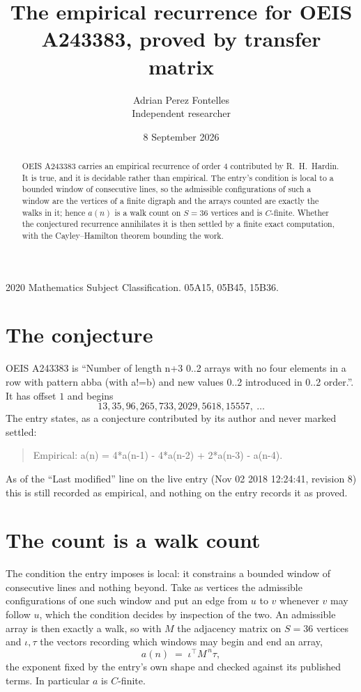 \documentclass[11pt,a4paper]{article}
\title{The empirical recurrence for OEIS A243383, proved by transfer matrix}
\author{Adrian Perez Fontelles\\ \small Independent researcher}
\date{8 September 2026}
\theoremstyle{plain}
\theoremstyle{definition}
\begin{document}
\maketitle

\begin{abstract}
OEIS A243383 carries an empirical recurrence of order $4$ contributed by R.~H.~Hardin. It is
true, and it is decidable rather than empirical. The entry's condition is local to a bounded window of consecutive lines, so
the admissible configurations of such a window are the vertices of a finite digraph and the
arrays counted are exactly the walks in it; hence $a(n)$ is a walk count on $S=36$ vertices
and is $C$-finite. Whether the conjectured recurrence annihilates it is then settled by a
finite exact computation, with the Cayley--Hamilton theorem bounding the work.
\end{abstract}

\noindent\small 2020 Mathematics Subject Classification. 05A15, 05B45, 15B36.\normalsize

\section{The conjecture}

OEIS A243383 is ``Number of length n+3 0..2 arrays with no four elements in a row with pattern abba (with a!=b) and new values 0..2 introduced in 0..2 order.''. It has offset $1$ and begins
\[
13, 35, 96, 265, 733, 2029, 5618, 15557,\ \dots
\]
The entry states, as a conjecture contributed by its author and never marked settled:
\begin{quote}
Empirical: a(n) = 4*a(n-1) - 4*a(n-2) + 2*a(n-3) - a(n-4).
\end{quote}
As of the ``Last modified'' line on the live entry (Nov 02 2018 12:24:41, revision 8) this is still
recorded as empirical, and nothing on the entry records it as proved.

\section{The count is a walk count}

The condition the entry imposes is local: it constrains a bounded window of consecutive lines and nothing beyond. Take as
vertices the admissible configurations of one such window and put an edge from $u$ to $v$
whenever $v$ may follow $u$, which the condition decides by inspection of the two. An
admissible array is then exactly a walk, so with $M$ the adjacency matrix on $S=36$ vertices
and $\iota,\tau$ the vectors recording which windows may begin and end an array,
\[
a(n)\;=\;\iota^{\!\top}M^{\,n}\tau ,
\]
the exponent fixed by the entry's own shape and checked against its published terms. In
particular $a$ is $C$-finite.
\end{document}
